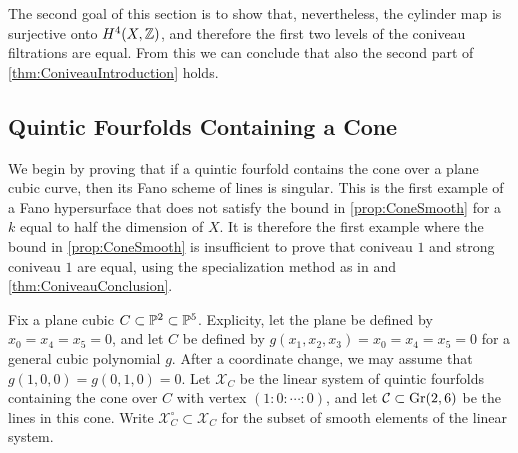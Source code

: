 The second goal of this section is to show that, nevertheless, the cylinder map is surjective onto $H^4(X,\Z)$, and therefore the first two levels of the coniveau filtrations are equal. From this we can conclude that also the second part of \cref{thm:ConiveauIntroduction} holds.

\subsection{Quintic Fourfolds Containing a Cone}
\label{sec:Computation}
We begin by proving that if a quintic fourfold contains the cone over a plane cubic curve, then its Fano scheme of lines is singular. This is the first example of a Fano hypersurface that does not satisfy the bound in \cref{prop:ConeSmooth} for a $k$ equal to half the dimension of $X$. It is therefore the first example where the bound in \cref{prop:ConeSmooth} is insufficient to prove that coniveau $1$ and strong coniveau $1$ are equal, using the specialization method as in \cite[Theorem 1.13]{VoisinConiveauThreefolds} and \cref{thm:ConiveauConclusion}.
   
Fix a plane cubic $C \subset \P^2 \subset \P^5$. Explicity, let the plane be defined by $x_0 = x_4 = x_5 = 0$, and let $C$ be defined by $g(x_1,x_2,x_3) = x_0 = x_4 = x_5 = 0$ for a general cubic polynomial $g$. After a coordinate change, we may assume that $g(1,0,0) = g(0,1,0) = 0$. Let $\mathscr{X}_C$ be the linear system of quintic fourfolds containing the cone over $C$ with vertex $(1:0:\cdots:0)$, and let $\mathcal{C} \subset \Gr(2,6)$ be the lines in this cone. Write $\mathscr{X}_C^\circ \subset \mathscr{X}_C$ for the subset of smooth elements of the linear system.
   
